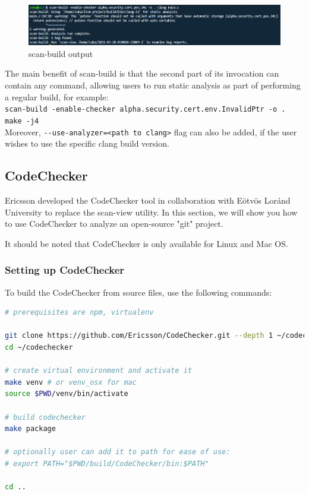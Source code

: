 \begin{figure}[H]
	\centering
	\includegraphics[width=\textwidth]{images/scan-build.PNG}
	\caption{scan-build output}
	\label{fig:scan-build}
\end{figure}


The main benefit of scan-build is that the second part of its invocation can contain any command, allowing users to run static analysis as part of performing a regular build, for example: \\ 
\lstinline{scan-build -enable-checker alpha.security.cert.env.InvalidPtr -o . make -j4} \\
Moreover, \lstinline{--use-analyzer=<path to clang>} flag can also be added, if the user wishes to use the specific clang build version.

\subsection{CodeChecker} \label{codechecker}
Ericsson developed the CodeChecker \cite{cc} tool in collaboration with Eötvös Loránd University to replace the scan-view utility.
In this section, we will show you how to use CodeChecker to analyze an open-source "git" project.

It should be noted that CodeChecker is only available for Linux and Mac OS. 


\subsubsection{Setting up CodeChecker}

To build the CodeChecker from source files, use the following commands: 
\begin{lstlisting}[caption={},label={}, language={bash}]
# prerequisites are npm, virtualenv

git clone https://github.com/Ericsson/CodeChecker.git --depth 1 ~/codechecker
cd ~/codechecker

# create virtual environment and activate it
make venv # or venv_osx for mac
source $PWD/venv/bin/activate

# build codechecker
make package

# optionally user can add it to path for ease of use:
# export PATH="$PWD/build/CodeChecker/bin:$PATH"

cd ..
\end{lstlisting}

